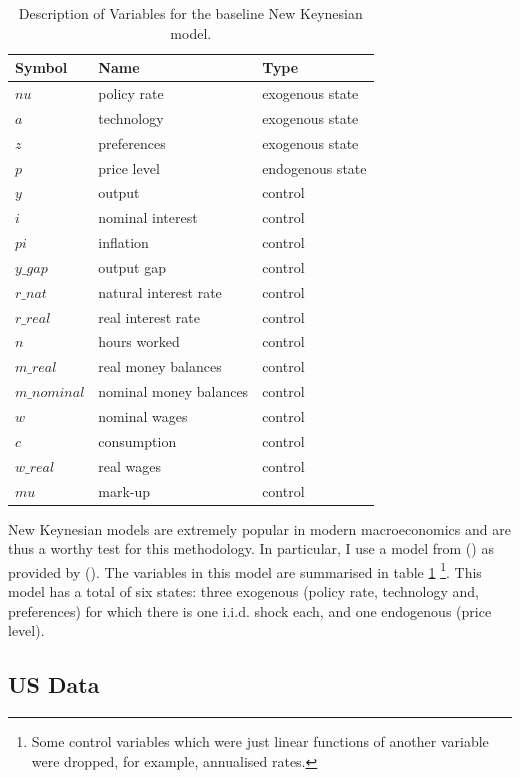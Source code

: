 \documentclass{article}
\begin{document}
\begin{table}
  \centering
  \begin{tabular}{|l|l|l|}
    \hline
    Symbol & Name & Type \\
    \hline
    $nu$ & policy rate & exogenous state \\
    $a$ & technology & exogenous state \\
    $z$ & preferences & exogenous state \\
    $p$ & price level & endogenous state \\
    $y$ & output & control \\
    $i$ & nominal interest & control \\
    $pi$ & inflation & control \\
    $y\_gap$ & output gap & control \\
    $r\_nat$ & natural interest rate & control \\
    $r\_real$ & real interest rate & control \\
    $n$ & hours worked & control \\
    $m\_real$ & real money balances & control \\
    $m\_nominal$ & nominal money balances & control \\
    $w$ & nominal wages & control \\ 
    $c$ & consumption & control \\
    $w\_real$ & real wages & control \\
    $mu$ & mark-up & control \\ \cline{2-2}
    \hline
  \end{tabular}
  \caption{Description of Variables for the baseline New Keynesian model.}
  \label{nk_data}
\end{table}

New Keynesian models are extremely popular in modern macroeconomics and are thus a worthy test for this methodology. In particular, I use a model from \citeauthor{gali2015monetary} (\citeyear{gali2015monetary}) as provided by \citeauthor{pfeifer2020} (\citeyear{pfeifer2020}). The variables in this model are summarised in table \ref{nk_data}  \footnote{Some control variables which were just linear functions of another variable were dropped, for example, annualised rates.}. This model has a total of six states: three exogenous (policy rate, technology and, preferences) for which there is one i.i.d. shock each, and one endogenous (price level).
\subsection{US Data}
\end{document}
